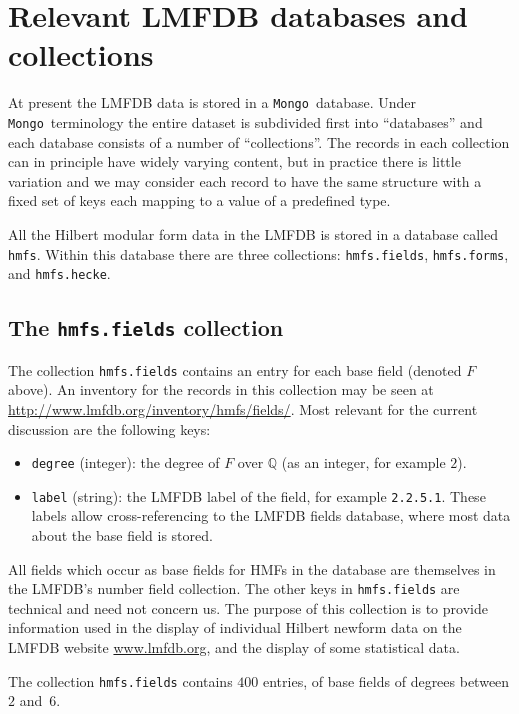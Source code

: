 \documentclass{llncs}
\def\Q{{\mathbb Q}}
\def\Mongo{{\tt Mongo}}
\begin{document}
\section{Relevant LMFDB databases and collections}
At present the LMFDB data is stored in a \Mongo\ database.  Under
\Mongo\ terminology the entire dataset is subdivided first into
``databases'' and each database consists of a number of
``collections''.  The records in each collection can in principle have
widely varying content, but in practice there is little variation and
we may consider each record to have the same structure with a fixed
set of keys each mapping to a value of a predefined type.

All the Hilbert modular form data in the LMFDB is stored in a database
called {\tt hmfs}.  Within this database there are three collections:
{\tt hmfs.fields}, {\tt hmfs.forms}, and {\tt hmfs.hecke}.

\subsection{The {\tt hmfs.fields} collection}
The collection {\tt hmfs.fields} contains an entry for each base field
(denoted $F$ above).  An inventory for the records in this collection
may be seen at \url{http://www.lmfdb.org/inventory/hmfs/fields/}.
Most relevant for the current discussion are the following keys:
\begin{itemize}
\item {\tt degree} (integer): the degree of $F$ over $\Q$ (as an
  integer, for example $2$).
\item {\tt label} (string): the LMFDB label of the field, for example
  {\tt 2.2.5.1}.  These labels allow cross-referencing to the LMFDB
  fields database, where most data about the base field is stored.
\end{itemize}
All fields which occur as base fields for HMFs in the database are
themselves in the LMFDB's number field collection.  The other keys in
{\tt hmfs.fields} are technical and need not concern us.  The purpose
of this collection is to provide information used in the display of
individual Hilbert newform data on the LMFDB website
\url{www.lmfdb.org}, and the display of some statistical data.

The collection {\tt hmfs.fields} contains $400$ entries, of base
fields of degrees between $2$ and~$6$.
\end{document}
